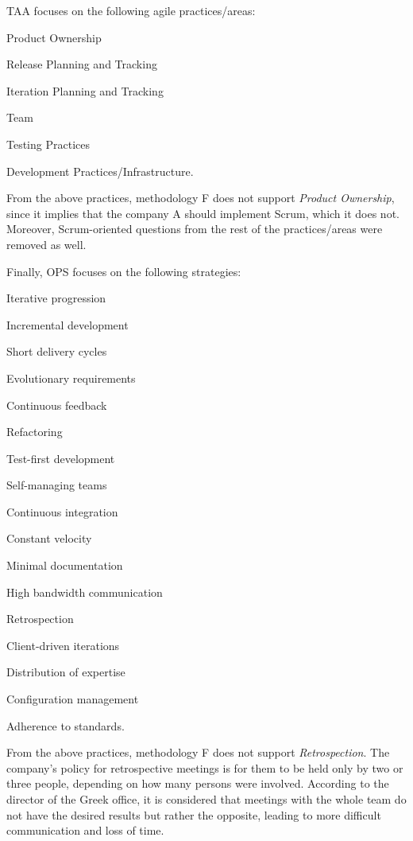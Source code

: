 \ac{TAA} focuses on the following agile practices/areas:
\begin{inparaenum} [a\upshape)]
	\item Product Ownership
	\item Release Planning and Tracking
	\item Iteration Planning and Tracking
	\item Team
	\item Testing Practices
	\item Development Practices/Infrastructure.
\end{inparaenum}
From the above practices, methodology F does not support \textit{Product Ownership}, since it implies that the company A should implement Scrum, which it does not. Moreover, Scrum-oriented questions from the rest of the practices/areas were removed as well. 

Finally, \ac{OPS} focuses on the following strategies:
\begin{inparaenum} [a\upshape)]
	\item Iterative progression
	\item Incremental development
	\item Short delivery cycles
	\item Evolutionary requirements
	\item Continuous feedback
	\item Refactoring
	\item Test-first development
	\item Self-managing teams
	\item Continuous integration
	\item Constant velocity
	\item Minimal documentation
	\item High bandwidth communication
	\item Retrospection
	\item Client-driven iterations
	\item Distribution of expertise
	\item Configuration management
	\item Adherence to standards.
\end{inparaenum}

From the above practices, methodology F does not support \textit{Retrospection}. The company's policy for retrospective meetings is for them to be held only by two or three people, depending on how many persons were involved. According to the director of the Greek office, it is considered that meetings with the whole team do not have the desired results but rather the opposite, leading to more difficult communication and loss of time.

